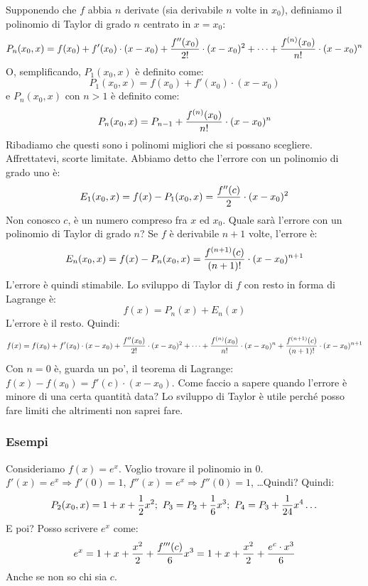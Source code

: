 \documentclass[12pt,a4paper]{article}
\begin{document}
Supponendo che $f$ abbia $n$ derivate (sia derivabile $n$ volte in $x_0$),
definiamo il polinomio di Taylor di grado $n$ centrato in $x = x_0$:
$$
P_n(x_0,x) = f(x_0) + f'(x_0) \cdot (x - x_0) +
{f''(x_0) \over 2!} \cdot (x - x_0)^2 + \dots + 
{f^{(n)}(x_0) \over n!} \cdot (x - x_0)^n
$$
O, semplificando, $P_1(x_0,x)$ \`e definito come:
$$
P_1(x_0,x) = f(x_0) + f'(x_0) \cdot (x - x_0)
$$
e $P_n(x_0,x)$ con $n > 1$ \`e definito come:
$$
P_n(x_0,x) = P_{n-1} + {f^{(n)} (x_0) \over n!} \cdot (x - x_0)^n
$$
Ribadiamo che questi sono i polinomi migliori che si possano scegliere.
Affrettatevi, scorte limitate. Abbiamo detto che l'errore con un polinomio
di grado uno \`e:
$$
E_1(x_0,x) = f(x) - P_1(x_0,x) = {f''(c) \over 2} \cdot (x - x_0)^2
$$
Non conosco $c$, \`e un numero compreso fra $x$ ed $x_0$. Quale sar\`a 
l'errore con un polinomio di Taylor di grado $n$? Se $f$ \`e derivabile
$n+1$ volte, l'errore \`e:
$$
E_n(x_0,x) = f(x) - P_n(x_0,x) = {f^{(n+1)}(c) \over (n+1)!} 
\cdot (x - x_0)^{n+1}
$$
L'errore \`e quindi stimabile. Lo sviluppo di Taylor di $f$ con resto in
forma di Lagrange \`e:
$$
f(x) = P_n(x) + E_n(x)
$$
L'errore \`e il resto. Quindi:
$$
f(x) = f(x_0) + f'(x_0) \cdot (x - x_0) +
{f''(x_0) \over 2!} \cdot (x - x_0)^2 + \dots + 
{f^{(n)}(x_0) \over n!} \cdot (x - x_0)^n +
{f^{(n+1)}(c) \over (n+1)!} \cdot (x - x_0)^{n+1}
$$
Con $n=0$ \`e, guarda un po', il teorema di Lagrange: 
$f(x) - f(x_0) = f'(c) \cdot (x - x_0)$. Come faccio a sapere quando 
l'errore \`e minore di una certa quantit\`a data? Lo sviluppo di Taylor
\`e utile perch\'e posso fare limiti che altrimenti non saprei fare.

\subsubsection{Esempi}
Consideriamo $f(x) = e^x$. Voglio trovare il polinomio in 0.
$f'(x) = e^x \Rightarrow f'(0) = 1$, 
$f''(x) = e^x \Rightarrow f''(0) = 1$, \dots Quindi? Quindi:
$$
P_2(x_0,x) = 1 + x + {1 \over 2} x^2 ; \ 
P_3 = P_2 + {1 \over 6} x^3 ; \
P_4 = P_3 + {1 \over 24} x^4 \dots
$$
E poi? Posso scrivere $e^x$ come:
$$
e^x = 1 + x + {x^2 \over 2} + {f'''(c) \over 6} x^3 =
1 + x + {x^2 \over 2} + {e^c \cdot x^3 \over 6}
$$
Anche se non so chi sia $c$.
\end{document}
